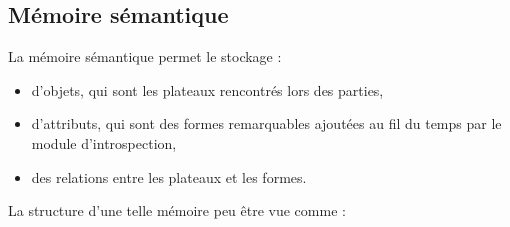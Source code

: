 \subsection{Mémoire sémantique}
\label{conception_memoire_semantique}

La mémoire sémantique permet le stockage :
\begin{itemize}
\item d'objets, qui sont les plateaux rencontrés lors des parties,
\item d'attributs, qui sont des formes remarquables ajoutées au fil du temps par le module  d'introspection,
\item des relations entre les plateaux et les formes.
\end{itemize}

La structure d'une telle mémoire peu être vue comme :
